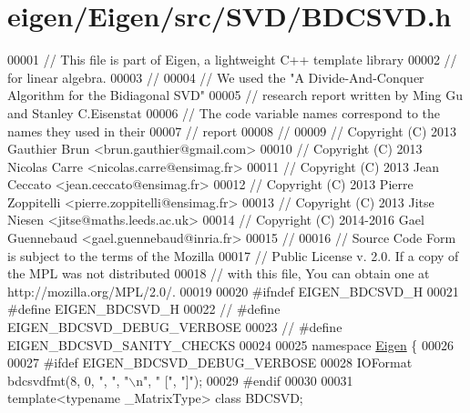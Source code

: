 \hypertarget{eigen_2_eigen_2src_2_s_v_d_2_b_d_c_s_v_d_8h_source}{}\section{eigen/\+Eigen/src/\+S\+V\+D/\+B\+D\+C\+S\+VD.h}
\label{eigen_2_eigen_2src_2_s_v_d_2_b_d_c_s_v_d_8h_source}

\begin{DoxyCode}
00001 \textcolor{comment}{// This file is part of Eigen, a lightweight C++ template library}
00002 \textcolor{comment}{// for linear algebra.}
00003 \textcolor{comment}{// }
00004 \textcolor{comment}{// We used the "A Divide-And-Conquer Algorithm for the Bidiagonal SVD"}
00005 \textcolor{comment}{// research report written by Ming Gu and Stanley C.Eisenstat}
00006 \textcolor{comment}{// The code variable names correspond to the names they used in their }
00007 \textcolor{comment}{// report}
00008 \textcolor{comment}{//}
00009 \textcolor{comment}{// Copyright (C) 2013 Gauthier Brun <brun.gauthier@gmail.com>}
00010 \textcolor{comment}{// Copyright (C) 2013 Nicolas Carre <nicolas.carre@ensimag.fr>}
00011 \textcolor{comment}{// Copyright (C) 2013 Jean Ceccato <jean.ceccato@ensimag.fr>}
00012 \textcolor{comment}{// Copyright (C) 2013 Pierre Zoppitelli <pierre.zoppitelli@ensimag.fr>}
00013 \textcolor{comment}{// Copyright (C) 2013 Jitse Niesen <jitse@maths.leeds.ac.uk>}
00014 \textcolor{comment}{// Copyright (C) 2014-2016 Gael Guennebaud <gael.guennebaud@inria.fr>}
00015 \textcolor{comment}{//}
00016 \textcolor{comment}{// Source Code Form is subject to the terms of the Mozilla}
00017 \textcolor{comment}{// Public License v. 2.0. If a copy of the MPL was not distributed}
00018 \textcolor{comment}{// with this file, You can obtain one at http://mozilla.org/MPL/2.0/.}
00019 
00020 \textcolor{preprocessor}{#ifndef EIGEN\_BDCSVD\_H}
00021 \textcolor{preprocessor}{#define EIGEN\_BDCSVD\_H}
00022 \textcolor{comment}{// #define EIGEN\_BDCSVD\_DEBUG\_VERBOSE}
00023 \textcolor{comment}{// #define EIGEN\_BDCSVD\_SANITY\_CHECKS}
00024 
00025 \textcolor{keyword}{namespace }\hyperlink{namespace_eigen}{Eigen} \{
00026 
00027 \textcolor{preprocessor}{#ifdef EIGEN\_BDCSVD\_DEBUG\_VERBOSE}
00028 IOFormat bdcsvdfmt(8, 0, \textcolor{stringliteral}{", "}, \textcolor{stringliteral}{"\(\backslash\)n"}, \textcolor{stringliteral}{"  ["}, \textcolor{stringliteral}{"]"});
00029 \textcolor{preprocessor}{#endif}
00030   
00031 \textcolor{keyword}{template}<\textcolor{keyword}{typename} \_MatrixType> \textcolor{keyword}{class }BDCSVD;

\end{DoxyCode}
